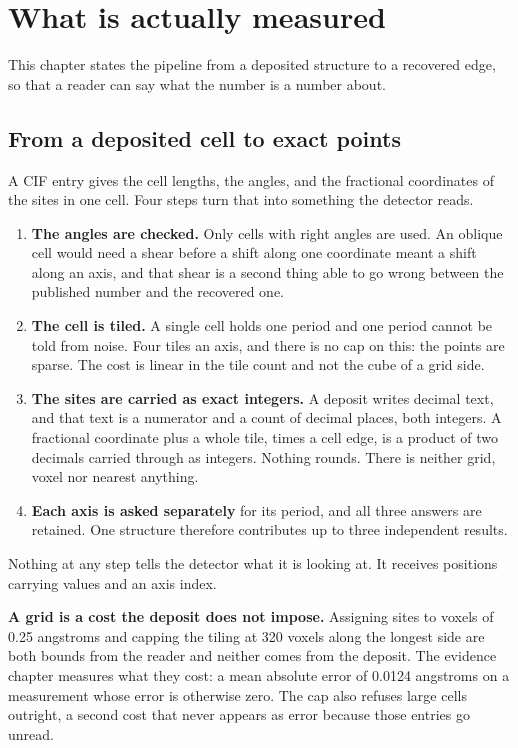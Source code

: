 \chapter{What is actually measured}

This chapter states the pipeline from a deposited structure to a recovered edge, so that a reader can say what the number is a number about.

\section{From a deposited cell to exact points}

A CIF entry gives the cell lengths, the angles, and the fractional coordinates of the sites in one cell. Four steps turn that into something the detector reads.

\begin{enumerate}
\item \textbf{The angles are checked.} Only cells with right angles are used. An oblique cell would need a shear before a shift along one coordinate meant a shift along an axis, and that shear is a second thing able to go wrong between the published number and the recovered one.
\item \textbf{The cell is tiled.} A single cell holds one period and one period cannot be told from noise. Four tiles an axis, and there is no cap on this: the points are sparse. The cost is linear in the tile count and not the cube of a grid side.
\item \textbf{The sites are carried as exact integers.} A deposit writes decimal text, and that text is a numerator and a count of decimal places, both integers. A fractional coordinate plus a whole tile, times a cell edge, is a product of two decimals carried through as integers. Nothing rounds. There is neither grid, voxel nor nearest anything.
\item \textbf{Each axis is asked separately} for its period, and all three answers are retained. One structure therefore contributes up to three independent results.
\end{enumerate}

Nothing at any step tells the detector what it is looking at. It receives positions carrying values and an axis index.

\textbf{A grid is a cost the deposit does not impose.} Assigning sites to voxels of 0.25 angstroms and capping the tiling at 320 voxels along the longest side are both bounds from the reader and neither comes from the deposit. The evidence chapter measures what they cost: a mean absolute error of 0.0124 angstroms on a measurement whose error is otherwise zero. The cap also refuses large cells outright, a second cost that never appears as error because those entries go unread.

